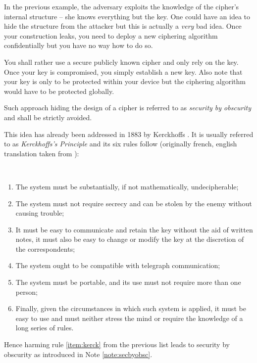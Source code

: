 \begin{note}
\label{note:secbyobsc}
	In the previous example, the adversary exploits the knowledge of the cipher's internal structure -- she knows everything but the key. One could have an idea to hide the structure from the attacker but this is actually a {\em very} bad idea. Once your construction leaks, you need to deploy a new ciphering algorithm confidentially but you have no way how to do so.
	
	You shall rather use a secure publicly known cipher and only rely on the key. Once your key is compromised, you simply establish a new key. Also note that your key is only to be protected within your device but the ciphering algorithm would have to be protected globally.
	
	Such approach hiding the design of a cipher is referred to as {\em security by obscurity} and shall be strictly avoided.
\end{note}

This idea has already been addressed in 1883 by Kerckhoffs \cite{auguste1883cryptographie}. It is usually referred to as {\em Kerckhoffs's Principle} and its six rules follow (originally french, english translation taken from \cite{petitcolas2016kerckhoffs}):
\begin{princ}[Kerckhoffs]
	~
	\begin{enumerate}
		\item The system must be substantially, if not mathematically, undecipherable;
		\item The system must not require secrecy and can be stolen by the enemy without causing trouble;\label{item:kerck}
		\item It must be easy to communicate and retain the key without the aid of written notes, it must also be easy to change or modify the key at the discretion of the correspondents;
		\item The system ought to be compatible with telegraph communication;
		\item The system must be portable, and its use must not require more than one person;
		\item Finally, given the circumstances in which such system is applied, it must be easy to use and must neither stress the mind or require the knowledge of a long series of rules.
	\end{enumerate}
\end{princ}
Hence harming rule \ref{item:kerck} from the previous list leads to security by obscurity as introduced in Note \ref{note:secbyobsc}.



